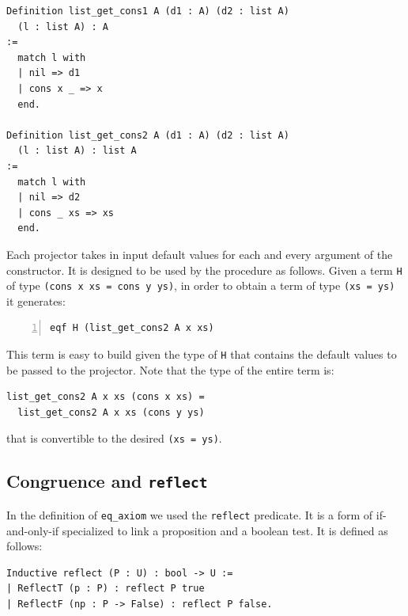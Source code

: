 \documentclass[sigplan,10pt,review]{acmart}\settopmatter{printfolios=true,printccs=false,printacmref=false}
\newcommand{\derive}[1]{\keys{#1}}
\begin{document}
\begin{minipage}{\textwidth}\begin{lstlisting}
Definition list_get_cons1 A (d1 : A) (d2 : list A)
  (l : list A) : A
:=
  match l with
  | nil => d1
  | cons x _ => x
  end.

Definition list_get_cons2 A (d1 : A) (d2 : list A)
  (l : list A) : list A
:=
  match l with
  | nil => d2
  | cons _ xs => xs
  end.
\end{lstlisting}\end{minipage}

\noindent
Each projector takes in input default values for each and every
argument of the constructor. It is designed to be used by the
\derive{injection} procedure as follows. Given a term
\lstinline+H+ of type \lstinline+(cons x xs = cons y ys)+, in order
to obtain a term of type \lstinline+(xs = ys)+ it generates:

\begin{minipage}{\textwidth}\begin{lstlisting}[numbers=left]
eqf H (list_get_cons2 A x xs)
\end{lstlisting}\end{minipage}

\noindent
This term is easy to build given the type of \lstinline+H+ that
contains the default values to be passed to the projector.
Note that the type of the entire term is:

\begin{minipage}{\textwidth}\begin{lstlisting}
list_get_cons2 A x xs (cons x xs) =
  list_get_cons2 A x xs (cons y ys)
\end{lstlisting}\end{minipage}

\noindent
that is convertible to the desired \lstinline+(xs = ys)+.

\subsection{Congruence and \lstinline+reflect+} %
\label{sec:reflect}

In the definition of \lstinline+eq_axiom+ we used the \lstinline+reflect+
predicate. It is a form of if-and-only-if specialized to link a
proposition and a boolean test. It is defined as follows:

\begin{minipage}{\textwidth}\begin{lstlisting}
Inductive reflect (P : U) : bool -> U :=
| ReflectT (p : P) : reflect P true
| ReflectF (np : P -> False) : reflect P false.
\end{lstlisting}\end{minipage}
\end{document}
